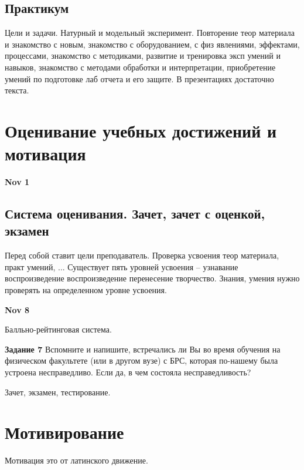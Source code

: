 \documentclass[a4paper, 12pt]{article}
\begin{document}
\subsection{Практикум}

Цели и задачи. Натурный и модельный эксперимент. Повторение теор 
материала и знакомство с новым, знакомство с оборудованием, с физ 
явлениями, эффектами, процессами, знакомство с методиками, развитие 
и тренировка эксп умений и навыков, знакомство с методами обработки 
и интерпретации, приобретение умений по подготовке лаб отчета и его 
защите. В презентациях достаточно текста.


\section{Оценивание учебных достижений и мотивация}

\hfill\textbf{Nov 1}

\subsection{Система оценивания. Зачет, зачет с оценкой, экзамен}

Перед собой ставит цели преподаватель. Проверка усвоения теор материала, 
практ умений, ... Существует пять уровней усвоения -- узнавание 
воспроизведение воспроизведение перенесение творчество. Знания, умения 
нужно проверять на определенном уровне усвоения.

\hfill\textbf{Nov 8}

Балльно-рейтинговая система.

\textbf{Задание 7} Вспомните и напишите, встречались ли Вы во время 
обучения на физическом факультете (или в другом вузе) с БРС, которая 
по-нашему была устроена несправедливо. Если да, в чем состояла 
несправедливость?

Зачет, экзамен, тестирование.


\section{Мотивирование}

Мотивация это от латинского движение.

\end{document}
